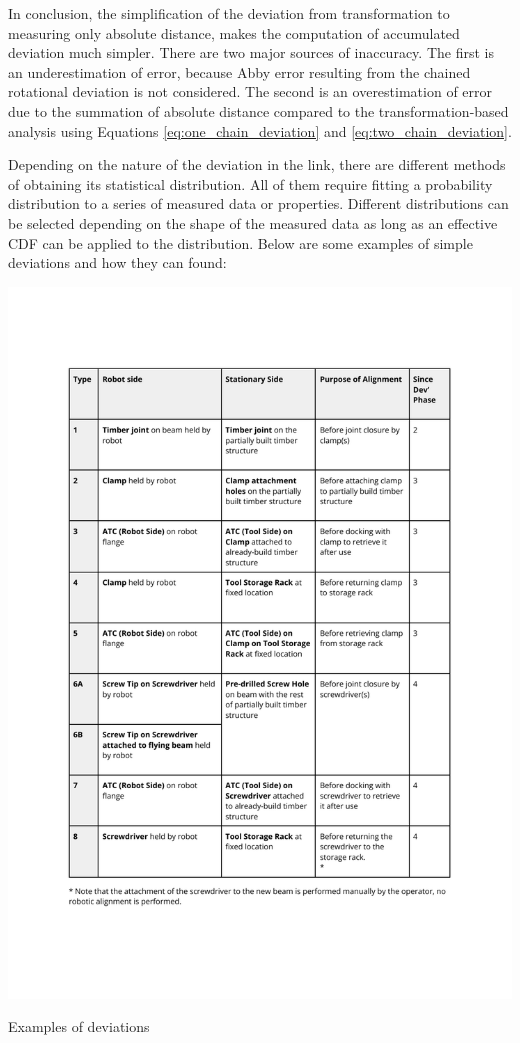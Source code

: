 In conclusion, the simplification of the deviation from transformation to measuring only absolute distance, makes the computation of accumulated deviation much simpler. There are two major sources of inaccuracy. The first is an underestimation of error, because Abby error resulting from the chained rotational deviation is not considered. The second is an overestimation of error due to the summation of absolute distance compared to the transformation-based analysis using Equations \ref{eq:one_chain_deviation} and \ref{eq:two_chain_deviation}.



Depending on the nature of the deviation in the link, there are different methods of obtaining its statistical distribution. All of them require fitting a probability distribution to a series of measured data or properties. Different distributions can be selected depending on the shape of the measured data as long as an effective CDF can be applied to the distribution. Below are some examples of simple deviations and how they can found:

\begin{table}
    \includegraphics[page=2, trim=25.4mm 130mm 25.4mm 33mm, clip, width=\textwidth]{tables/Tables in Chapter 9 to 11.pdf}
    \caption{Examples of deviations}
\end{table}

